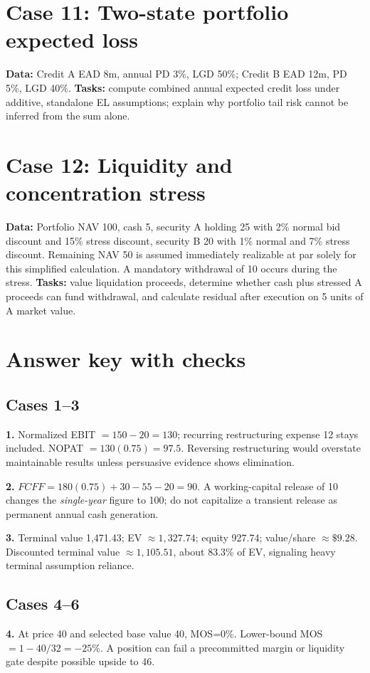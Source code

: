 \documentclass[11pt,letterpaper]{article}
\begin{document}
\section{Case 11: Two-state portfolio expected loss}
\textbf{Data:} Credit A EAD 8m, annual PD 3\%, LGD 50\%; Credit B EAD 12m, PD 5\%, LGD 40\%. \textbf{Tasks:} compute combined annual expected credit loss under additive, standalone EL assumptions; explain why portfolio tail risk cannot be inferred from the sum alone.

\section{Case 12: Liquidity and concentration stress}
\textbf{Data:} Portfolio NAV 100, cash 5, security A holding 25 with 2\% normal bid discount and 15\% stress discount, security B 20 with 1\% normal and 7\% stress discount. Remaining NAV 50 is assumed immediately realizable at par solely for this simplified calculation. A mandatory withdrawal of 10 occurs during the stress. \textbf{Tasks:} value liquidation proceeds, determine whether cash plus stressed A proceeds can fund withdrawal, and calculate residual after execution on 5 units of A market value.

\section{Answer key with checks}
\subsection{Cases 1--3}
\textbf{1.} Normalized EBIT $=150-20=130$; recurring restructuring expense 12 stays included. NOPAT $=130(0.75)=97.5$. Reversing restructuring would overstate maintainable results unless persuasive evidence shows elimination.

\textbf{2.} $FCFF=180(0.75)+30-55-20=90$. A working-capital release of 10 changes the \emph{single-year} figure to 100; do not capitalize a transient release as permanent annual cash generation.

\textbf{3.} Terminal value 1,471.43; EV $\approx 1{,}327.74$; equity 927.74; value/share $\approx\$9.28$. Discounted terminal value $\approx1{,}105.51$, about 83.3\% of EV, signaling heavy terminal assumption reliance.

\subsection{Cases 4--6}
\textbf{4.} At price 40 and selected base value 40, MOS=0\%. Lower-bound MOS $=1-40/32=-25\%$. A position can fail a precommitted margin or liquidity gate despite possible upside to 46.
\end{document}
